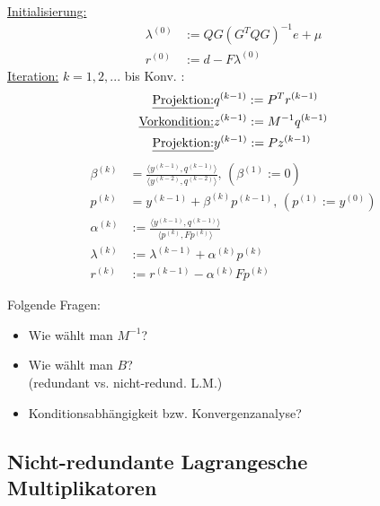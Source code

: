 \begin{algorithmus}
\underline{Initialisierung:}\\
\begin{align*}
\lambda^{(0)} &:= QG(G^TQG)^{-1} e + \mu \\
r^{(0)} &:= d- F \lambda^{(0)}
\end{align*}
\underline{Iteration:} $k=1,2,...$ bis Konv. : \\
\begin{align*}
\text{\underline{Projektion:}} & q^{(k-1)} := P^T r^{(k-1)} \\
\text{\underline{Vorkondition:}} & z^{(k-1)} := M^{-1} q^{(k-1)} \\
\text{\underline{Projektion:}} & y^{(k-1)} := P z^{(k-1)}
\end{align*}
\begin{align*}
\beta^{(k)} &= \frac{\langle y^{(k-1)} , q^{(k-1)} \rangle}{\langle y^{(k-2)} , q^{(k-2)} \rangle}, \, (\beta^{(1)}:=0 ) \\
p^{(k)} &= y^{(k-1)} + \beta^{(k)}p^{(k-1)} , \, (p^{(1)}:=y^{(0)}) \\
\alpha^{(k)} &:= \frac{\langle y^{(k-1)} , q ^{(k-1)} \rangle}{ \langle p^{(k)} , F p^{(k)} \rangle } \\
\lambda^{(k)} &:= \lambda^{(k-1)} + \alpha^{(k)}p^{(k)} \\
r^{(k)} &:= r^{(k-1)} - \alpha^{(k)}Fp^{(k)}
\end{align*}
\end{algorithmus}
Folgende Fragen:
\begin{itemize}
\item
Wie wählt man $M^{-1}$?
\item
Wie wählt man $B$?\\
(redundant vs. nicht-redund. L.M.)
\item
Konditionsabhängigkeit bzw. Konvergenzanalyse?
\end{itemize}

\subsection{Nicht-redundante Lagrangesche Multiplikatoren}


